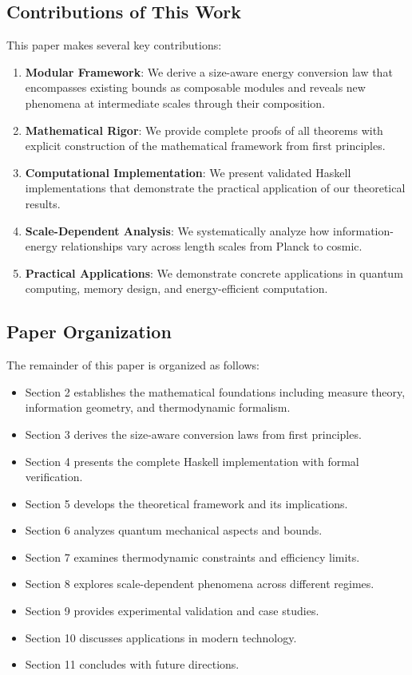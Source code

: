 \documentclass[11pt,a4paper]{article}
\theoremstyle{definition}
\begin{document}
\subsection{Contributions of This Work}

This paper makes several key contributions:

\begin{enumerate}
\item \textbf{Modular Framework}: We derive a size-aware energy conversion law that encompasses existing bounds as composable modules and reveals new phenomena at intermediate scales through their composition.

\item \textbf{Mathematical Rigor}: We provide complete proofs of all theorems with explicit construction of the mathematical framework from first principles.

\item \textbf{Computational Implementation}: We present validated Haskell implementations that demonstrate the practical application of our theoretical results.

\item \textbf{Scale-Dependent Analysis}: We systematically analyze how information-energy relationships vary across length scales from Planck to cosmic.

\item \textbf{Practical Applications}: We demonstrate concrete applications in quantum computing, memory design, and energy-efficient computation.
\end{enumerate}

\subsection{Paper Organization}

The remainder of this paper is organized as follows:

\begin{itemize}
\item Section 2 establishes the mathematical foundations including measure theory, information geometry, and thermodynamic formalism.
\item Section 3 derives the size-aware conversion laws from first principles.
\item Section 4 presents the complete Haskell implementation with formal verification.
\item Section 5 develops the theoretical framework and its implications.
\item Section 6 analyzes quantum mechanical aspects and bounds.
\item Section 7 examines thermodynamic constraints and efficiency limits.
\item Section 8 explores scale-dependent phenomena across different regimes.
\item Section 9 provides experimental validation and case studies.
\item Section 10 discusses applications in modern technology.
\item Section 11 concludes with future directions.
\end{itemize}
\end{document}
